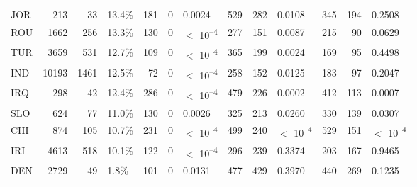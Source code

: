 \begin{tabular}[t]{lrrlrrlrrlrrl}
JOR & 213 & 33 & 13.4\% & 181 & 0 & 0.0024 & 529 & 282 & 0.0108 & 345 & 194 & 0.2508\\
ROU & 1662 & 256 & 13.3\% & 130 & 0 & $<$ 10\textsuperscript{--4} & 277 & 151 & 0.0087 & 215 & 90 & 0.0629\\
TUR & 3659 & 531 & 12.7\% & 109 & 0 & $<$ 10\textsuperscript{--4} & 365 & 199 & 0.0024 & 169 & 95 & 0.4498\\
IND & 10193 & 1461 & 12.5\% & 72 & 0 & $<$ 10\textsuperscript{--4} & 258 & 152 & 0.0125 & 183 & 97 & 0.2047\\
IRQ & 298 & 42 & 12.4\% & 286 & 0 & $<$ 10\textsuperscript{--4} & 479 & 226 & 0.0002 & 412 & 113 & 0.0007\\
SLO & 624 & 77 & 11.0\% & 130 & 0 & 0.0026 & 325 & 213 & 0.0260 & 330 & 139 & 0.0307\\
CHI & 874 & 105 & 10.7\% & 231 & 0 & $<$ 10\textsuperscript{--4} & 499 & 240 & $<$ 10\textsuperscript{--4} & 529 & 151 & $<$ 10\textsuperscript{--4}\\
IRI & 4613 & 518 & 10.1\% & 122 & 0 & $<$ 10\textsuperscript{--4} & 296 & 239 & 0.3374 & 203 & 167 & 0.9465\\
DEN & 2729 & 49 & 1.8\% & 101 & 0 & 0.0131 & 477 & 429 & 0.3970 & 440 & 269 & 0.1235\\
\bottomrule
\end{tabular}
